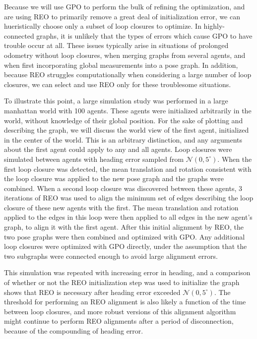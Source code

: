 Because we will use GPO to perform the bulk of refining the optimization, and are using REO to primarily remove a great deal of initialization error, we can hueristically choose only a subset of loop closures to optimize.  In highly-connected graphs, it is unlikely that the types of errors which cause GPO to have trouble occur at all.  These issues typically arise in situations of prolonged odometry without loop closures, when merging graphs from several agents, and when first incorporating global measurements into a pose graph.  In addition, because REO struggles computationally when considering a large number of loop closures, we can select and use REO only for these troublesome situations.

To illustrate this point, a large simulation study was performed in a large manhattan world with 100 agents.  These agents were initialized arbitrarily in the world, without knowledge of their global position.  For the sake of plotting and describing the graph, we will discuss the world view of the first agent, initialized in the center of the world.  This is an arbitrary distinction, and any arguments about the first agent could apply to any and all agents. Loop closures were simulated between agents with heading error sampled from $\mathcal{N}(0, 5^\circ)$.  When the first loop closure was detected, the mean translation and rotation consistent with the loop closure was applied to the new pose graph and the graphs were combined.  When a second loop closure was discovered between these agents, 3 iterations of REO was used to align the minimum set of edges describing the loop closure of these new agents with the first.  The mean translation and rotation applied to the edges in this loop were then applied to all edges in the new agent's graph, to align it with the first agent.  After this initial alignment by REO, the two pose graphs were then combined and optimized with GPO.  Any additional loop closures were optimized with GPO directly, under the assumption that the two subgraphs were connected enough to avoid large alignment errors.

This simulation was repeated with increasing error in heading, and a comparison of whether or not the REO initialization step was used to initialize the graph shows that REO is necessary after heading error exceeded $\mathcal{N}(0,5^\circ)$.  The threshold for performing an REO alignment is also likely a function of the time between loop closures, and more robust versions of this alignment algorithm might continue to perform REO alignments after a period of disconnection, because of the compounding of heading error.

